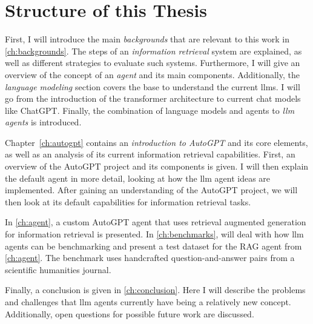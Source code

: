 \documentclass[../main.tex]{subfiles}
\begin{document}
\section{Structure of this Thesis}

First, I will introduce the main \emph{backgrounds}
that are relevant to this work in \autoref{ch:backgrounds}.
The steps of an \emph{information retrieval} system are explained, as well
as different strategies to evaluate such systems.
Furthermore, I will give an overview of the concept of an \emph{agent} and its main components.
Additionally, the \emph{language modeling} section covers the base
to understand the current \glspl{llm}.
I will go from the introduction of the transformer architecture to current chat models like ChatGPT.
Finally, the combination of language models and agents to \emph{\gls{llm} agents} is introduced.

Chapter~\ref{ch:autogpt} contains an \emph{introduction to AutoGPT} and its core elements,
as well as an analysis of its current information retrieval capabilities.
First, an overview of the AutoGPT project and its components is given.
I will then explain the default agent in more detail,
looking at how the \gls{llm} agent ideas are implemented.
After gaining an understanding of the AutoGPT project,
we will then look at its default capabilities for information retrieval tasks.

In \autoref{ch:agent},
a custom AutoGPT agent that uses retrieval augmented generation for information retrieval is presented.
In \autoref{ch:benchmarks}, will deal with how \gls{llm} agents can be benchmarking
and present a test dataset for the RAG agent from \autoref{ch:agent}.
The benchmark uses handcrafted question-and-answer pairs from a scientific humanities journal.

Finally, a conclusion is given in \autoref{ch:conclusion}.
Here I will describe the problems and challenges
that \gls{llm} agents currently have being a relatively new concept.
Additionally, open questions for possible future work are discussed.
\end{document}
